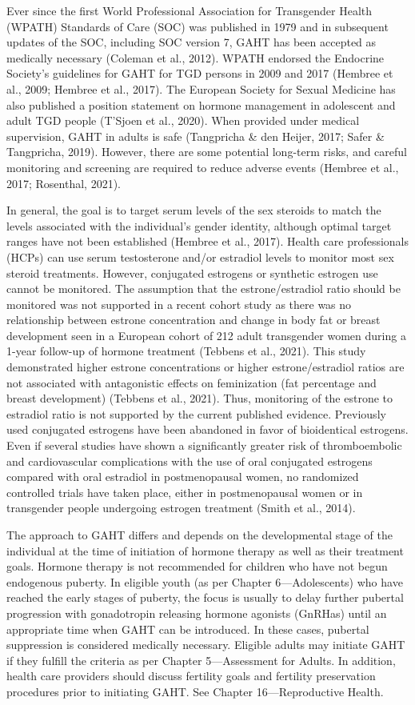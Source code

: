 \documentclass[
]{book}
\begin{document}
Ever since the first World Professional
Association for Transgender Health (WPATH)
Standards of Care (SOC) was published in 1979
and in subsequent updates of the SOC, including
SOC version 7, GAHT has been accepted as medically necessary (Coleman et al., 2012). WPATH
endorsed the Endocrine Society's guidelines for
GAHT for TGD persons in 2009 and 2017
(Hembree et al., 2009; Hembree et al., 2017). The
European Society for Sexual Medicine has also
published a position statement on hormone management in adolescent and adult TGD people
(T'Sjoen et al., 2020). When provided under medical supervision, GAHT in adults is safe
(Tangpricha \& den Heijer, 2017; Safer \&
Tangpricha, 2019). However, there are some
potential long-term risks, and careful monitoring
and screening are required to reduce adverse
events (Hembree et al., 2017; Rosenthal, 2021).

In general, the goal is to target serum levels
of the sex steroids to match the levels associated
with the individual's gender identity, although
optimal target ranges have not been established
(Hembree et al., 2017). Health care professionals
(HCPs) can use serum testosterone and/or estradiol levels to monitor most sex steroid treatments.
However, conjugated estrogens or synthetic estrogen use cannot be monitored. The assumption
that the estrone/estradiol ratio should be monitored was not supported in a recent cohort study
as there was no relationship between estrone
concentration and change in body fat or breast
development seen in a European cohort of 212
adult transgender women during a 1-year
follow-up of hormone treatment (Tebbens et al.,
2021). This study demonstrated higher estrone
concentrations or higher estrone/estradiol ratios
are not associated with antagonistic effects on
feminization (fat percentage and breast development) (Tebbens et al., 2021). Thus, monitoring
of the estrone to estradiol ratio is not supported
by the current published evidence. Previously
used conjugated estrogens have been abandoned
in favor of bioidentical estrogens. Even if several
studies have shown a significantly greater risk of
thromboembolic and cardiovascular complications
with the use of oral conjugated estrogens compared with oral estradiol in postmenopausal
women, no randomized controlled trials have
taken place, either in postmenopausal women or
in transgender people undergoing estrogen treatment (Smith et al., 2014).

The approach to GAHT differs and depends on
the developmental stage of the individual at the
time of initiation of hormone therapy as well as
their treatment goals. Hormone therapy is not recommended for children who have not begun
endogenous puberty. In eligible youth (as per
Chapter 6---Adolescents) who have reached the
early stages of puberty, the focus is usually to delay
further pubertal progression with gonadotropin
releasing hormone agonists (GnRHas) until an
appropriate time when GAHT can be introduced.
In these cases, pubertal suppression is considered
medically necessary. Eligible adults may initiate
GAHT if they fulfill the criteria as per Chapter
5---Assessment for Adults. In addition, health care
providers should discuss fertility goals and fertility
preservation procedures prior to initiating GAHT.
See Chapter 16---Reproductive Health.
\end{document}
